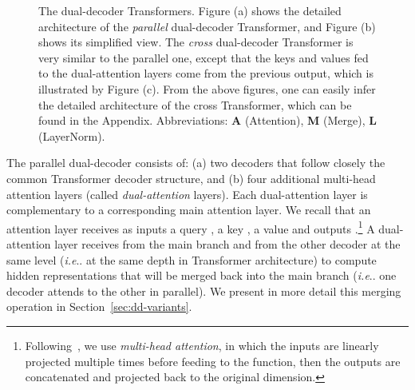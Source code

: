 \documentclass[11pt]{article}
\makeatletter
\DeclareRobustCommand\onedot{\futurelet\@let@token\@onedot}
\def\@onedot{\ifx\@let@token.\else.\null\fi\xspace}
\def\ie{\emph{i.e}\onedot} \def\Ie{\emph{I.e}\onedot}
\theoremstyle{plain}
\theoremstyle{definition}
\makeatother
\begin{document}
\begin{figure}[!htb]
\caption{The dual-decoder Transformers. Figure (a) shows the detailed architecture of the \emph{parallel} dual-decoder Transformer, and Figure (b) shows its simplified view. The \emph{cross} dual-decoder Transformer is very similar to the parallel one, except that the keys and values fed to the dual-attention layers come from the previous output, which is illustrated by Figure (c). From the above figures, one can easily infer the detailed architecture of the cross Transformer, which can be found in the Appendix. 
Abbreviations: \textbf{A} (Attention), \textbf{M} (Merge),  \textbf{L} (LayerNorm). 
}
\label{fig:dd-transformer}
\end{figure}

The parallel dual-decoder consists of: (a) two decoders that follow closely the common Transformer decoder structure, and (b) four additional multi-head attention layers (called \emph{dual-attention} layers). Each dual-attention layer is complementary to a corresponding main attention layer. We recall that an attention layer receives as inputs a query , a key , a value  and outputs .\footnote{Following~, we use \emph{multi-head attention}, in which the inputs are linearly projected multiple times before feeding to the function, then the outputs are concatenated and projected back to the original dimension.}
A dual-attention layer receives  from the main branch and  from the other decoder at the same level (\ie at the same depth in Transformer architecture) to compute hidden representations that will be merged back into the main branch (\ie one decoder attends to the other in parallel). We present in more detail this merging operation in Section~\ref{sec:dd-variants}.
\end{document}
